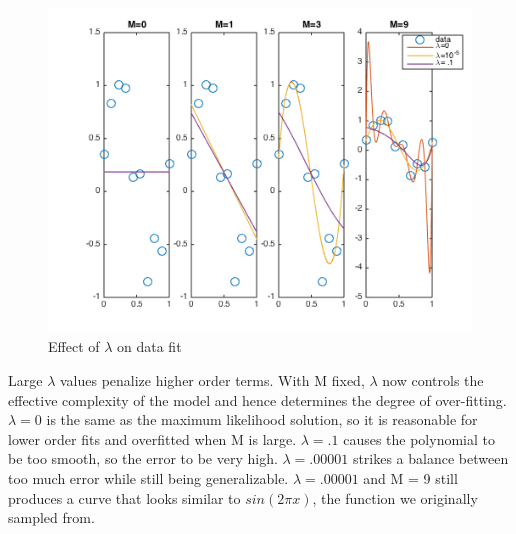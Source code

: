 \documentclass[10pt,twocolumn]{article}
\begin{document}
\begin{figure}[H]
\center
\includegraphics[scale =.5]{rr_lambdas.png}
\caption{Effect of $\lambda$ on data fit}
\end{figure}

Large $\lambda$ values penalize higher order terms. With M fixed, $\lambda$ now controls the effective complexity
of the model and hence determines the degree of over-fitting.  $\lambda = 0$ is the same as the maximum likelihood solution, so it is reasonable for lower order fits and overfitted when M is large. $\lambda = .1$ causes the polynomial to be too smooth, so the error to be very high. $\lambda = .00001$ strikes a balance between too much error while still being generalizable. $\lambda = .00001$ and M = 9 still produces a curve that looks similar to $sin(2\pi x)$, the function we originally sampled from.
\end{document}
